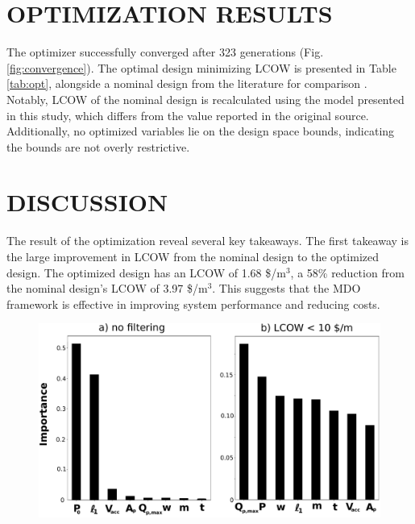 \documentclass[twocolumn,10pt]{asme2e}
\begin{document}
\section{OPTIMIZATION RESULTS}
The optimizer successfully converged after 323 generations (Fig. \ref{fig:convergence}). The optimal design minimizing LCOW is presented in Table \ref{tab:opt}, alongside a nominal design from the literature for comparison \cite{YJecon2017}. Notably, LCOW of the nominal design is recalculated using the model presented in this study, which differs from the value reported in the original source. Additionally, no optimized variables lie on the design space bounds, indicating the bounds are not overly restrictive.

\section{DISCUSSION}

The result of the optimization reveal several key takeaways. The first takeaway is the large improvement in LCOW from the nominal design to the optimized design. The optimized design has an LCOW of 1.68 \$/m$^3$, a 58\% reduction from the nominal design's LCOW of 3.97 \$/m$^3$. This suggests that the MDO framework is effective in improving system performance and reducing costs.

\begin{figure}
    \centering
    \includegraphics[width=\linewidth]{../figs/importance.pdf}
    \label{fig:importance}
\end{figure}
\end{document}
